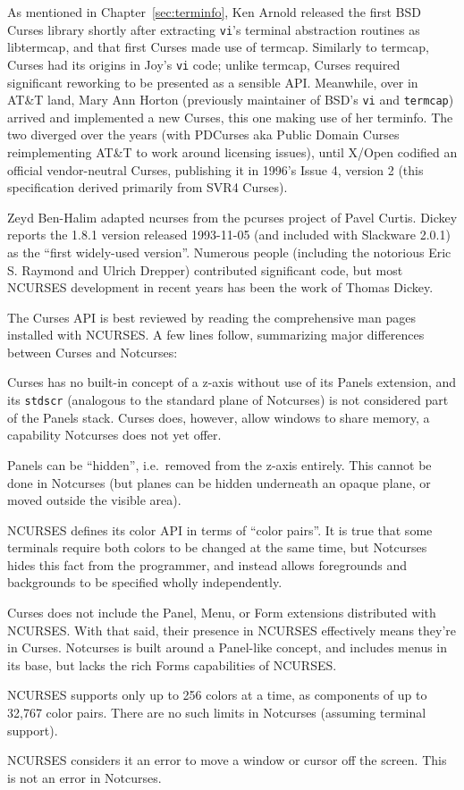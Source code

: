 As mentioned in Chapter~\ref{sec:terminfo}, Ken Arnold released the first BSD
Curses library shortly after extracting \texttt{vi}'s terminal abstraction routines
as libtermcap, and that first Curses made use of termcap\cite{cursesexplained}.
Similarly to termcap, Curses had its origins in Joy's \texttt{vi} code; unlike
termcap, Curses required significant reworking to be presented as a sensible
API. Meanwhile, over in AT\&T land, Mary Ann Horton (previously maintainer of
BSD's \texttt{vi} and \texttt{termcap}) arrived and implemented a new Curses,
this one making use of her terminfo. The two diverged over the years (with PDCurses
aka Public Domain Curses reimplementing AT\&T to work around licensing issues),
until X/Open codified an official vendor-neutral Curses, publishing it in
1996's Issue 4, version 2 (this specification derived primarily from SVR4 Curses).

Zeyd Ben-Halim adapted ncurses from the pcurses project of Pavel Curtis. Dickey
reports the 1.8.1 version released 1993-11-05 (and included with Slackware 2.0.1)
as the ``first widely-used version''. Numerous people (including the notorious
Eric S. Raymond and Ulrich Drepper) contributed significant code, but most NCURSES
development in recent years has been the work of Thomas Dickey.

The Curses API is best reviewed by reading the comprehensive man pages installed
with NCURSES. A few lines follow, summarizing major differences between Curses and Notcurses:

\begin{denseitemize}
\item{Curses has no built-in concept of a z-axis without use of its Panels
    extension, and its \texttt{stdscr} (analogous to the standard plane of
    Notcurses) is not considered part of the Panels stack. Curses does, however,
    allow windows to share memory, a capability Notcurses does not yet offer.}
\item{Panels can be ``hidden'', i.e.\ removed from the z-axis entirely. This cannot
    be done in Notcurses (but planes can be hidden underneath an opaque plane,
    or moved outside the visible area).}
\item{NCURSES defines its color API in terms of ``color pairs''. It is true that some
    terminals require both colors to be changed at the same time, but Notcurses
    hides this fact from the programmer, and instead allows foregrounds and backgrounds
    to be specified wholly independently.}
\item{Curses does not include the Panel, Menu, or Form extensions distributed
    with NCURSES. With that said, their presence in NCURSES effectively means
    they're in Curses. Notcurses is built around a Panel-like concept, and
    includes menus in its base, but lacks the rich Forms capabilities of NCURSES.}
\item{NCURSES supports only up to 256 colors at a time, as components of up to
    32,767 color pairs. There are no such limits in Notcurses (assuming terminal support).}
\item{NCURSES considers it an error to move a window or cursor off the screen. This
    is not an error in Notcurses.}
\end{denseitemize}
